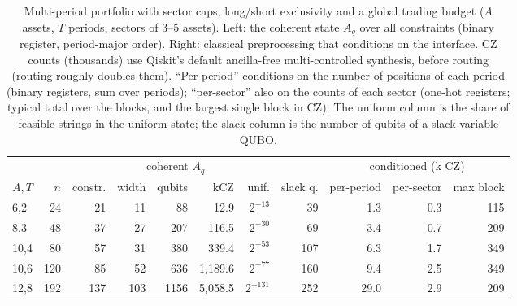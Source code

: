 \begin{table}[t]
\centering\footnotesize\setlength{\tabcolsep}{2.6pt}
\caption{ Multi-period portfolio with sector caps, long/short exclusivity and a global trading budget ($A$ assets, $T$ periods, sectors of $3$--$5$ assets). Left: the coherent state $A_q$ over all constraints (binary register, period-major order). Right: classical preprocessing that conditions on the interface. CZ counts (thousands) use Qiskit's default ancilla-free multi-controlled synthesis, before routing (routing roughly doubles them). ``Per-period'' conditions on the number of positions of each period (binary registers, sum over periods); ``per-sector'' also on the counts of each sector (one-hot registers; typical total over the blocks, and the largest single block in CZ). The uniform column is the share of feasible strings in the uniform state; the slack column is the number of qubits of a slack-variable QUBO.}\label{tab:large_scaling}
\begin{tabular}{lrrrrrrrrrr}
\toprule
 & & & \multicolumn{3}{c}{coherent $A_q$} & & & \multicolumn{3}{c}{conditioned (k CZ)}\\
\cmidrule(lr){4-6}\cmidrule(lr){9-11}
$A,T$ & $n$ & constr. & width & qubits & kCZ & unif. & slack q. & per-period & per-sector & max block\\
\midrule
6,2 & 24 & 21 & 11 & 88 & 12.9 & $2^{-13}$ & 39 & 1.3 & 0.3 & 115\\
8,3 & 48 & 37 & 27 & 207 & 116.5 & $2^{-30}$ & 69 & 3.4 & 0.7 & 209\\
10,4 & 80 & 57 & 31 & 380 & 339.4 & $2^{-53}$ & 107 & 6.3 & 1.7 & 349\\
10,6 & 120 & 85 & 52 & 636 & 1,189.6 & $2^{-77}$ & 160 & 9.4 & 2.5 & 349\\
12,8 & 192 & 137 & 103 & 1156 & 5,058.5 & $2^{-131}$ & 252 & 29.0 & 2.9 & 209\\
\bottomrule
\end{tabular}
\end{table}
